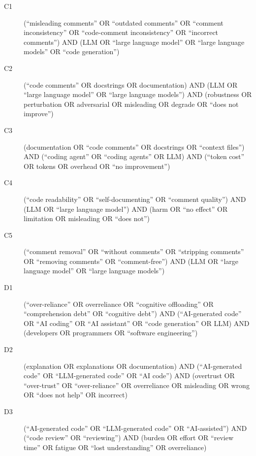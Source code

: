 \begin{description}
  \item[C1] (\enquote{misleading comments} OR \enquote{outdated comments} OR
    \enquote{comment inconsistency} OR \enquote{code-comment inconsistency} OR
    \enquote{incorrect comments}) AND (LLM OR \enquote{large language model} OR
    \enquote{large language models} OR \enquote{code generation})
  \item[C2] (\enquote{code comments} OR docstrings OR documentation) AND (LLM
    OR \enquote{large language model} OR \enquote{large language models}) AND
    (robustness OR perturbation OR adversarial OR misleading OR degrade OR
    \enquote{does not improve})
  \item[C3] (documentation OR \enquote{code comments} OR docstrings OR
    \enquote{context files}) AND (\enquote{coding agent} OR \enquote{coding
    agents} OR LLM) AND (\enquote{token cost} OR tokens OR overhead OR
    \enquote{no improvement})
  \item[C4] (\enquote{code readability} OR \enquote{self-documenting} OR
    \enquote{comment quality}) AND (LLM OR \enquote{large language model}) AND
    (harm OR \enquote{no effect} OR limitation OR misleading OR \enquote{does
    not})
  \item[C5] (\enquote{comment removal} OR \enquote{without comments} OR
    \enquote{stripping comments} OR \enquote{removing comments} OR
    \enquote{comment-free}) AND (LLM OR \enquote{large language model} OR
    \enquote{large language models})
  \item[D1] (\enquote{over-reliance} OR overreliance OR \enquote{cognitive
    offloading} OR \enquote{comprehension debt} OR \enquote{cognitive debt})
    AND (\enquote{AI-generated code} OR \enquote{AI coding} OR \enquote{AI
    assistant} OR \enquote{code generation} OR LLM) AND (developers OR
    programmers OR \enquote{software engineering})
  \item[D2] (explanation OR explanations OR documentation) AND
    (\enquote{AI-generated code} OR \enquote{LLM-generated code} OR \enquote{AI
    code}) AND (overtrust OR \enquote{over-trust} OR \enquote{over-reliance} OR
    overreliance OR misleading OR wrong OR \enquote{does not help} OR
    incorrect)
  \item[D3] (\enquote{AI-generated code} OR \enquote{LLM-generated code} OR
    \enquote{AI-assisted}) AND (\enquote{code review} OR \enquote{reviewing})
    AND (burden OR effort OR \enquote{review time} OR fatigue OR \enquote{lost
    understanding} OR overreliance)

\end{description}

